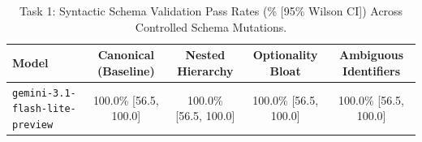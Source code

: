 \begin{table}[t]
\centering
\small
\caption{Task 1: Syntactic Schema Validation Pass Rates (\% [95\% Wilson CI]) Across Controlled Schema Mutations.}
\label{tab:task1_syntactic}
\begin{tabular}{lcccc}
\toprule
\textbf{Model} & \textbf{Canonical (Baseline)} & \textbf{Nested Hierarchy} & \textbf{Optionality Bloat} & \textbf{Ambiguous Identifiers} \\
\midrule
\texttt{gemini-3.1-flash-lite-preview} & 100.0\% [56.5, 100.0] & 100.0\% [56.5, 100.0] & 100.0\% [56.5, 100.0] & 100.0\% [56.5, 100.0] \\
\bottomrule
\end{tabular}
\end{table}